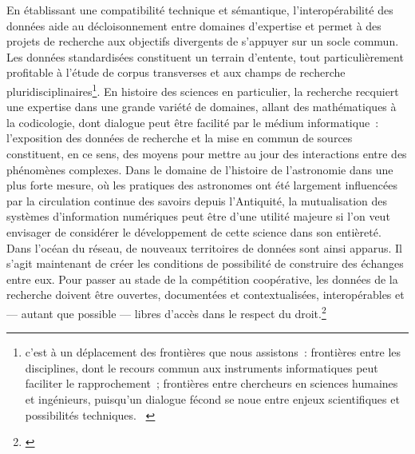 \documentclass[a4paper,12pt,twoside]{book}
\let\quoteOld\quote
\let\endquoteOld\endquote
\renewenvironment{quote}{\small\quoteOld}{\endquoteOld}
\newcommand{\p}{[\ldots]\xspace}
\newcommand{\g}[1]{\og#1~\fg}
\begin{document}
En établissant une compatibilité technique et sémantique, l'interopérabilité des données aide au décloisonnement entre domaines d'expertise et permet à des projets de recherche aux objectifs divergents de s'appuyer sur un socle commun. Les données standardisées constituent un terrain d'entente, tout particulièrement profitable à l'étude de corpus transverses et aux champs de recherche pluridisciplinaires\footnote{\g{\p c’est à un déplacement des frontières que nous assistons~: frontières entre les disciplines, dont le recours commun aux instruments informatiques peut faciliter le rapprochement~; frontières entre chercheurs en sciences humaines et ingénieurs, puisqu’un dialogue fécond se noue entre enjeux scientifiques et possibilités techniques.} \cite[p.~3]{dacosEtatLieuxPositionnement2013}}. En histoire des sciences en particulier, la recherche recquiert une expertise dans une grande variété de domaines, allant des mathématiques à la codicologie, dont dialogue peut être facilité par le médium informatique~: l'exposition des données de recherche et la mise en commun de sources constituent, en ce sens, des moyens pour mettre au jour des interactions entre des phénomènes complexes. Dans le domaine de l'histoire de l'astronomie dans une plus forte mesure, où les pratiques des astronomes ont été largement influencées par la circulation continue des savoirs depuis l'Antiquité, la mutualisation des systèmes d'information numériques peut être d'une utilité majeure si l'on veut envisager de considérer le développement de cette science dans son entièreté.\\

\begin{quote}
	Dans l’océan du réseau, de nouveaux territoires de données sont ainsi apparus. Il s’agit maintenant de créer les conditions  de  possibilité  de  construire  des  échanges  entre  eux.  Pour  passer  au  stade  de  la  compétition  coopérative,  les  données  de  la  recherche  doivent  être  ouvertes,  documentées et contextualisées, interopérables et — autant que possible — libres d’accès dans le respect du droit.\footnote{\cite{rennevilleHumaNumNouvelleTres2013}}\\
\end{quote}
\end{document}
